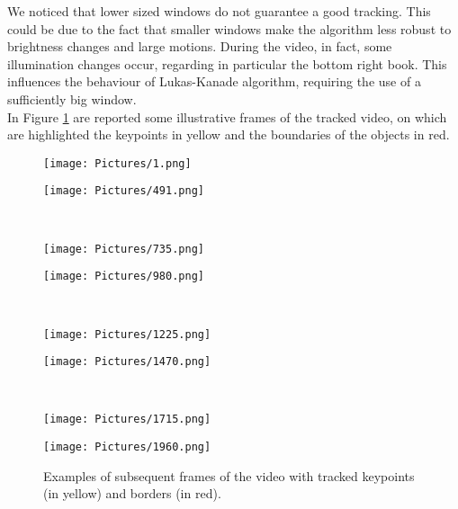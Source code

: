 \documentclass[12pt,a4paper]{article}
\begin{document}
We noticed that lower sized windows do not guarantee a good tracking. This could be due to the fact that smaller windows make the algorithm less robust to brightness changes and large motions. During the video, in fact, some illumination changes occur, regarding in particular the bottom right book. This influences the behaviour of Lukas-Kanade algorithm, requiring the use of a sufficiently big window. \\
In Figure \ref{fig} are reported some illustrative frames of the tracked video, on which are highlighted the keypoints in yellow and the boundaries of the objects in red.

\begin{figure}[htbp]
 \centering
 \begin{minipage}{0.49\textwidth}
 	 \centering
	 \texttt{[image: Pictures/1.png]}
  \end{minipage}
 \begin{minipage}{0.49\textwidth} 
 	\centering
 	\texttt{[image: Pictures/491.png]}
 \end{minipage}\\
\vspace{0.15cm}
\begin{minipage}{0.49\textwidth}
 	\centering
	\texttt{[image: Pictures/735.png]}
\end{minipage}
 \begin{minipage}{0.49\textwidth}
	\centering
	\texttt{[image: Pictures/980.png]}
\end{minipage}\\
 \vspace{0.15cm}
  \begin{minipage}{0.49\textwidth}
 	 \centering
	 \texttt{[image: Pictures/1225.png]}
  \end{minipage}
 \begin{minipage}{0.49\textwidth} 
 	\centering
 	\texttt{[image: Pictures/1470.png]}
 \end{minipage}\\
\vspace{0.15cm}
\begin{minipage}{0.49\textwidth}
 	\centering
	\texttt{[image: Pictures/1715.png]}
\end{minipage}
 \begin{minipage}{0.49\textwidth}
	\centering
	\texttt{[image: Pictures/1960.png]}
\end{minipage}
 \caption{Examples of subsequent frames of the video with tracked keypoints (in yellow) and borders (in red).}
 \label{fig}
\end{figure} 
\end{document}

